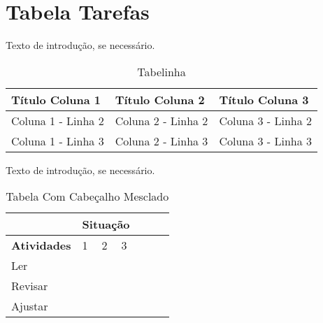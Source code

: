 \chapter{Tabela Tarefas}

Texto de introdução, se necessário.

\begin{table}[H]
	\centering
	\caption{Tabelinha}
	\label{tabela:tabelinha}
	\begin{tabular}{lll}
		\hline     
		\textbf{Título Coluna 1}  & \textbf{Título Coluna 2}   & \textbf{Título Coluna 3} \\
		\hline
		Coluna 1 - Linha 2  & Coluna 2 - Linha 2   & Coluna 3 - Linha 2 \\
		Coluna 1 - Linha 3  & Coluna 2 - Linha 3   & Coluna 3 - Linha 3
	\end{tabular}
\end{table}


Texto de introdução, se necessário.

\begin{table}[H]
	\centering
	\caption{Tabela Com Cabeçalho Mesclado}
	\label{tabela:tabelinha2}
		\begin{tabular}{lllllll}
			& \multicolumn{3}{l}{\textbf{Situação}} \\
			\hline
			\textbf{Atividades}                 & 1   & 2   & 3  \\
			\hline
			Ler  & \checkmark   & \checkmark   & \checkmark  \\
			Revisar &     & \checkmark   & \checkmark  \\
			Ajustar       & \checkmark   & \checkmark   & \checkmark  
	\end{tabular}
\end{table}
